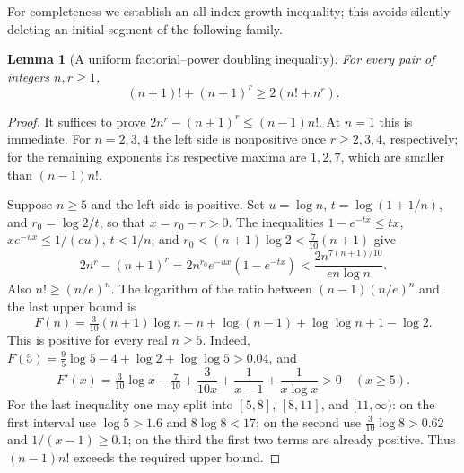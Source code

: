 \documentclass[11pt,a4paper]{article}
\newtheorem{lemma}[theorem]{Lemma}
\theoremstyle{definition}
\theoremstyle{remark}
\numberwithin{equation}{section}
\begin{document}
For completeness we establish an all-index growth inequality; this
avoids silently deleting an initial segment of the following family.

\begin{lemma}[A uniform factorial--power doubling inequality]
\label{tw:lem:factorial-power-doubling}
For every pair of integers $n,r\ge1$,
\[
 (n+1)!+(n+1)^r\ge 2(n!+n^r).
\]
\end{lemma}
\begin{proof}
It suffices to prove
$2n^r-(n+1)^r\le(n-1)n!$.  At $n=1$ this is immediate.
For $n=2,3,4$ the left side is nonpositive once $r\ge2,3,4$,
respectively; for the remaining exponents its respective maxima are
$1,2,7$, which are smaller than $(n-1)n!$.

Suppose $n\ge5$ and the left side is positive.  Set
$u=\log n$, $t=\log(1+1/n)$, and $r_0=\log2/t$, so that
$x=r_0-r>0$.  The inequalities
$1-e^{-tx}\le tx$, $xe^{-ux}\le1/(eu)$,
$t<1/n$, and $r_0<(n+1)\log2<\tfrac7{10}(n+1)$ give
\[
 2n^r-(n+1)^r
 =2n^{r_0}e^{-ux}(1-e^{-tx})
 <\frac{2n^{7(n+1)/10}}{en\log n}.
\]
Also $n!\ge(n/e)^n$.  The logarithm of the ratio between
$(n-1)(n/e)^n$ and the last upper bound is
\[
 F(n)=\tfrac3{10}(n+1)\log n-n+\log(n-1)
      +\log\log n+1-\log2.
\]
This is positive for every real $n\ge5$.  Indeed,
$F(5)=\tfrac95\log5-4+\log2+\log\log5>0.04$, and
\[
 F'(x)=\tfrac3{10}\log x-\tfrac7{10}
       +\frac3{10x}+\frac1{x-1}+\frac1{x\log x}>0\quad(x\ge5).
\]
For the last inequality one may split into $[5,8]$, $[8,11]$,
and $[11,\infty)$: on the first interval use
$\log5>1.6$ and $8\log8<17$; on the second use
$\tfrac3{10}\log8>0.62$ and $1/(x-1)\ge0.1$;
on the third the first two terms are already positive.
Thus $(n-1)n!$ exceeds the required upper bound.
\end{proof}
\end{document}
